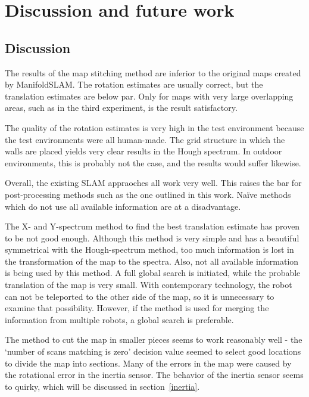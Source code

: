 
\chapter{Discussion and future work}
\label{discussion}

\section{Discussion}
The results of the map stitching method are inferior to the original maps created by ManifoldSLAM. The rotation estimates are usually correct, but the translation estimates are below par. Only for maps with very large overlapping areas, such as in the third experiment, is the result satisfactory.

The quality of the rotation estimates is very high in the test environment because the test environments were all human-made. The grid structure in which the walls are placed yields very clear results in the Hough spectrum. In outdoor environments, this is probably not the case, and the results would suffer likewise.

Overall, the existing SLAM appraoches all work very well. This raises the bar for post-processing methods such as the one outlined in this work. Na\"ive methods which do not use all available information are at a disadvantage.

The X- and Y-spectrum method to find the best translation estimate has proven to be not good enough. Although this method is very simple and has a beautiful symmetrical with the Hough-spectrum method, too much information is lost in the transformation of the map to the spectra. Also, not all available information is being used by this method. A full global search is initiated, while the probable translation of the map is very small. With contemporary technology, the robot can not be teleported to the other side of the map, so it is unnecessary to examine that possibility. However, if the method is used for merging the information from multiple robots, a global search is preferable. 

The method to cut the map in smaller pieces seems to work reasonably well - the `number of scans matching is zero' decision value seemed to select good locations to divide the map into sections. Many of the errors in the map were caused by the rotational error in the inertia sensor. The behavior of the inertia sensor seems to quirky, which will be discussed in section~\ref{inertia}.

